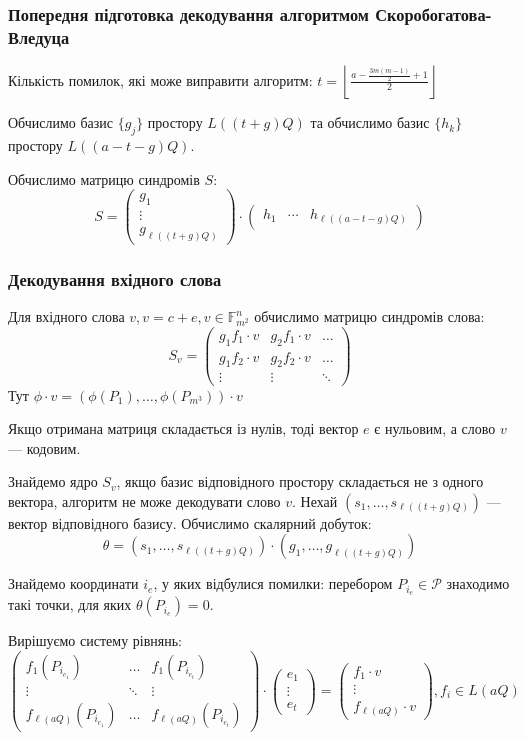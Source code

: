 \documentclass[a4paper,12pt,oneside]{article}
\begin{document}
\subsubsection{Попередня підготовка декодування алгоритмом Скоробогатова-Вледуца}
Кількість помилок, які може виправити алгоритм: $t = \left \lfloor \frac{a-\frac{3m(m-1)}{2} + 1}{2} \right \rfloor$

Обчислимо базис $\{g_j\}$ простору $L( (t+g)Q )$ та обчислимо базис $\{h_k\}$ простору $L( (a-t-g)Q)$.

Обчислимо матрицю синдромів $S$:
$$
S = 
\begin{pmatrix}
    g_1 \\
    \vdots \\
    g_{\ell( (t+g)Q )}
\end{pmatrix}
\cdot
\begin{pmatrix}
    h_1 & \cdots & h_{\ell( (a-t-g)Q)}
\end{pmatrix}
$$

\subsubsection{Декодування вхідного слова}
Для вхідного слова $v, v=c+e, v \in \mathbb{F}_{m^2}^n$ обчислимо матрицю синдромів слова:
$$
S_v = 
\begin{pmatrix}
    g_1 f_1 \cdot v & g_2 f_1 \cdot v & \dots \\
    g_1 f_2 \cdot v & g_2 f_2 \cdot v & \dots \\
    \vdots & \vdots & \ddots
\end{pmatrix}
$$
Тут $\phi \cdot v = (\phi(P_1), \dots , \phi(P_{m^3})) \cdot v$

Якщо отримана матриця складається із нулів, тоді вектор $e$ є нульовим, а слово $v$ --- кодовим.

Знайдемо ядро $S_v$, якщо базис відповідного простору складається не з одного вектора, алгоритм не може декодувати слово $v$.
Нехай $(s_1, \dots, s_{\ell( (t+g)Q )})$ --- вектор відповідного базису. Обчислимо скалярний добуток:
$$\theta = (s_1, \dots, s_{\ell( (t+g)Q )}) \cdot (g_1, \dots, g_{\ell( (t+g)Q )})$$

Знайдемо координати $i_e$, у яких відбулися помилки: перебором $P_{i_e} \in \mathcal{P}$ знаходимо такі точки, для яких $\theta(P_{i_e})=0$.

Вирішуємо систему рівнянь:
$$
\begin{pmatrix}
    f_1 ( P_{i_{e_1}} ) & \dots & f_1 ( P_{i_{e_t}} ) \\
    \vdots & \ddots & \vdots \\
    f_{\ell(aQ)} ( P_{i_{e_1}} ) & \dots & f_{\ell(aQ)} ( P_{i_{e_t}} )
\end{pmatrix} \cdot 
\begin{pmatrix}
    e_1 \\
    \vdots \\
    e_t
\end{pmatrix} = 
\begin{pmatrix}
    f_1 \cdot v \\
    \vdots \\
    f_{\ell(aQ)} \cdot v
\end{pmatrix}, f_i \in L(aQ)
$$
\end{document}
